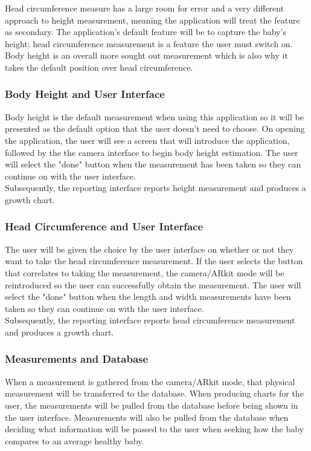 \documentclass[onecolumn, draftclsnofoot,10pt, compsoc]{IEEEtran}
\begin{document}
Head circumference measure has a large room for error and a very different approach to height measurement, meaning the application will treat the feature as secondary. The application's default feature will be to capture the baby's height; head circumference measurement is a feature the user must switch on. Body height is an overall more sought out measurement which is also why it takes the default position over head circumference.

\subsubsection{Body Height and User Interface}

Body height is the default measurement when using this application so it will be presented as the default option that the user doesn't need to choose. On opening the application, the user will see a screen that will introduce the application, followed by the the camera interface to begin body height estimation. The user will select the "done" button when the measurement has been taken so they can continue on with the user interface.\\

Subsequently, the reporting interface reports height measurement and produces a growth chart.

\subsubsection{Head Circumference and User Interface}
The user will be given the choice by the user interface on whether or not they want to take the head circumference measurement. If the user selects the button that correlates to taking the measurement, the camera/ARkit mode will be reintroduced so the user can successfully obtain the measurement. The user will select the "done" button when the length and width measurements have been taken so they can continue on with the user interface.\\

Subsequently, the reporting interface reports head circumference measurement and produces a growth chart.

\subsubsection{Measurements and Database}
When a measurement is gathered from the camera/ARkit mode, that physical measurement will be transferred to the database. When producing charts for the user, the measurements will be pulled from the database before being shown in the user interface. Measurements will also be pulled from the database when deciding what information will be passed to the user when seeking how the baby compares to an average healthy baby.
\end{document}
